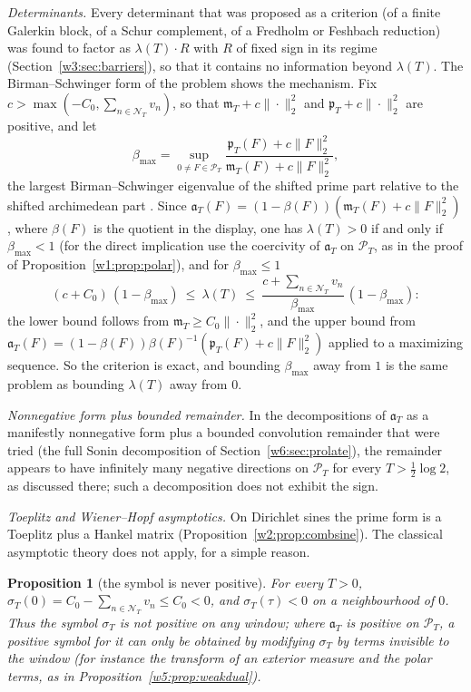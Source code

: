 \documentclass[11pt]{amsart}
\newtheorem{proposition}[theorem]{Proposition}
\theoremstyle{definition}
\theoremstyle{remark}
\numberwithin{equation}{section}
\newcommand{\PT}{\mathcal{P}_T}                        %
\newcommand{\NT}{\mathcal{N}_T}                        %
\newcommand{\mT}{\mathfrak{m}_T}                       %
\newcommand{\pT}{\mathfrak{p}_T}                       %
\newcommand{\aT}{\mathfrak{a}_T}                       %
\newcommand{\sT}{\sigma_T}                             %
\newcommand{\lam}{\lambda(T)}                          %
\begin{document}
\emph{Determinants.} Every determinant that was proposed as a criterion (of a finite Galerkin block, of a Schur
complement, of a Fredholm or Feshbach reduction) was found to factor as $\lam\cdot R$ with $R$ of fixed sign in its
regime (Section~\ref{w3:sec:barriers}), so that it contains no information beyond $\lam$. The Birman--Schwinger form of
the problem shows the mechanism. Fix $c>\max(-C_0,\sum_{n\in\NT}v_n)$, so that $\mT+c\|\cdot\|_2^2$ and
$\pT+c\|\cdot\|_2^2$ are positive, and let
\[
  \beta_{\max}=\sup_{0\ne F\in\PT}\frac{\pT(F)+c\|F\|_2^2}{\mT(F)+c\|F\|_2^2},
\]
the largest Birman--Schwinger eigenvalue of the shifted prime part relative to the shifted archimedean part
\cite{ReedSimon4}. Since $\aT(F)=(1-\beta(F))(\mT(F)+c\|F\|_2^2)$, where $\beta(F)$ is the quotient in the display, one
has $\lam>0$ if and only if $\beta_{\max}<1$ (for the direct implication use the coercivity of $\aT$ on $\PT$, as in
the proof of Proposition~\ref{w1:prop:polar}), and for $\beta_{\max}\le1$
\[
  (c+C_0)\,(1-\beta_{\max})\ \le\ \lam\ \le\ \frac{c+\sum_{n\in\NT}v_n}{\beta_{\max}}\,(1-\beta_{\max}) :
\]
the lower bound follows from $\mT\ge C_0\|\cdot\|_2^2$, and the upper bound from
$\aT(F)=(1-\beta(F))\beta(F)^{-1}(\pT(F)+c\|F\|_2^2)$ applied to a maximizing sequence. So the criterion is exact, and
bounding $\beta_{\max}$ away from $1$ is the same problem as bounding $\lam$ away from $0$.

\emph{Nonnegative form plus bounded remainder.} In the decompositions of $\aT$ as a manifestly nonnegative form plus a
bounded convolution remainder that were tried (the full Sonin decomposition of Section~\ref{w6:sec:prolate}), the
remainder appears to have infinitely many negative directions on $\PT$ for every $T>\frac12\log2$, as discussed there;
such a decomposition does not exhibit the sign.

\emph{Toeplitz and Wiener--Hopf asymptotics.} On Dirichlet sines the prime form is a Toeplitz plus a Hankel matrix
(Proposition~\ref{w2:prop:combsine}). The classical asymptotic theory does not apply, for a simple reason.

\begin{proposition}[the symbol is never positive]\label{w5:prop:symbolneg}
For every $T>0$, $\sT(0)=C_0-\sum_{n\in\NT}v_n\le C_0<0$, and $\sT(\tau)<0$ on a neighbourhood of $0$. Thus the symbol $\sT$ is not
positive on any window; where $\aT$ is positive on $\PT$, a positive symbol for it can only be obtained by modifying $\sT$
by terms invisible to the window (for instance the transform of an exterior measure and the polar terms, as in Proposition~\ref{w5:prop:weakdual}).
\end{proposition}
\end{document}
